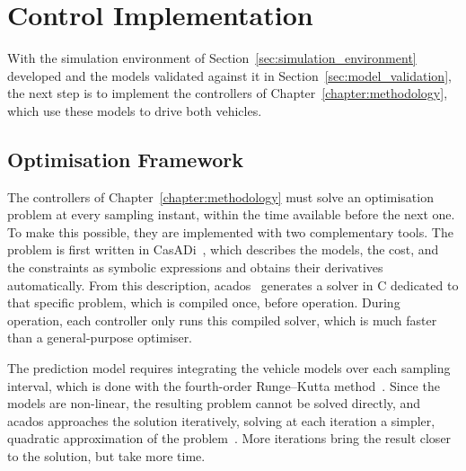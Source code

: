 
\section{Control Implementation}
\label{sec:controller_implementation}



With the simulation environment of Section~\ref{sec:simulation_environment} developed and the models validated against it in Section~\ref{sec:model_validation}, the next step is to implement the controllers of Chapter~\ref{chapter:methodology}, which use these models to drive both vehicles.

\subsection{Optimisation Framework}
\label{subsec:nmpc_solver_framework}

The controllers of Chapter~\ref{chapter:methodology} must solve an optimisation problem at every sampling instant, within the time available before the next one. To make this possible, they are implemented with two complementary tools. The problem is first written in CasADi~\cite{anderssonCasADiSoftwareFramework2019}, which describes the models, the cost, and the constraints as symbolic expressions and obtains their derivatives automatically. From this description, acados~\cite{verschueren2022acados} generates a solver in C dedicated to that specific problem, which is compiled once, before operation. During operation, each controller only runs this compiled solver, which is much faster than a general-purpose optimiser.

The prediction model requires integrating the vehicle models over each sampling interval, which is done with the fourth-order Runge--Kutta method~\cite{kutta1901}. Since the models are non-linear, the resulting problem cannot be solved directly, and acados approaches the solution iteratively, solving at each iteration a simpler, quadratic approximation of the problem~\cite{frison2020hpipm}. More iterations bring the result closer to the solution, but take more time.


